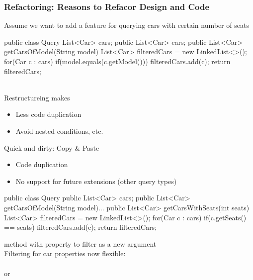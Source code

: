 \subsubsection{Refactoring: Reasons to Refacor Design and Code}
\begin{defBox}
    Assume we want to add a feature for querying cars with certain number of seats
\end{defBox}
\begin{codeBlock}{}
    public class Query{
        List<Car> cars;
        public List<Car> cars;
        public List<Car> getCarsOfModel(String model){
            List<Car> filteredCars = new LinkedList<>();
            for(Car c : cars){
                if(model.equals(c.getModel())){
                    filteredCars.add(c);
                }
            }
            return filteredCars;
        }
    }
\end{codeBlock}
\\
Restructureing makes 
\begin{itemize}
    \item Less code duplication
    \item Avoid nested conditions, etc.
\end{itemize}
\begin{defBox}
    Quick and dirty: Copy \& Paste\\
    \begin{itemize}
        \item Code duplication
        \item No support for future extensions (other query types)
    \end{itemize}
\end{defBox}
\begin{codeBlock}{}
    public class Query{
        public List<Car> cars;
        public List<Car> getCarsOfModel(String model){...}
        public List<Car> getCarsWithSeats(int seats){
            List<Car> filteredCars = new LinkedList<>();
            for(Car c : cars){
                if(c.getSeats() == seats){
                    filteredCars.add(c);
                }
            }
            return filteredCars;
        }
    }
\end{codeBlock}
\begin{defBox}
     method with property  to filter as a new argument\\
    Filtering for car properties now flexible:\\
    \\
    or\\
\end{defBox}
